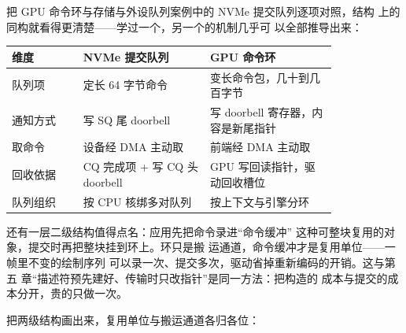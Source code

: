 把 GPU 命令环与存储与外设队列案例中的 NVMe 提交队列逐项对照，结构
上的同构就看得更清楚——学过一个，另一个的机制几乎可
以全部推导出来：

\begin{longtable}{L{0.18\linewidth}L{0.32\linewidth}L{0.32\linewidth}}
\toprule
维度 & NVMe 提交队列 & GPU 命令环 \\
\midrule
队列项 & 定长 64 字节命令 & 变长命令包，几十到几百字节 \\\tablerowrule
通知方式 & 写 SQ 尾 doorbell & 写 doorbell 寄存器，内容是新尾指针 \\\tablerowrule
取命令 & 设备经 DMA 主动取 & 前端经 DMA 主动取 \\\tablerowrule
回收依据 & CQ 完成项 + 写 CQ 头 doorbell & GPU 写回读指针，驱动回收槽位 \\\tablerowrule
队列组织 & 按 CPU 核绑多对队列 & 按上下文与引擎分环 \\
\bottomrule
\end{longtable}

还有一层二级结构值得点名：应用先把命令录进“命令缓冲”
这种可整块复用的对象，提交时再把整块挂到环上。环只是搬
运通道，命令缓冲才是复用单位——一帧里不变的绘制序列
可以录一次、提交多次，驱动省掉重新编码的开销。这与第五
章“描述符预先建好、传输时只改指针”是同一方法：把构造的
成本与提交的成本分开，贵的只做一次。

把两级结构画出来，复用单位与搬运通道各归各位：

